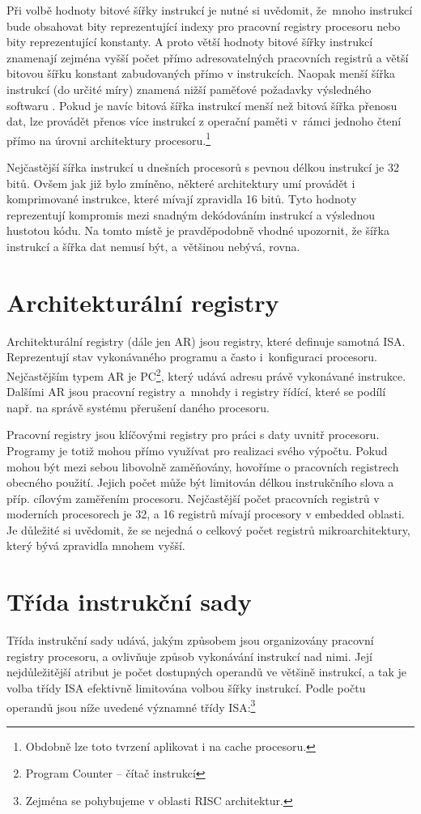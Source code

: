 \documentclass[
  digital, %
  color,   %
  table,   %
  twoside, %
  nolof,   %
  nolot,   %
]{fithesis3}
\begin{document}
Při volbě hodnoty bitové šířky instrukcí je nutné si uvědomit, že~mnoho instrukcí bude obsahovat bity reprezentující indexy pro pracovní registry procesoru nebo bity reprezentující konstanty. A proto větší hodnoty bitové šířky instrukcí znamenají zejména vyšší počet přímo adresovatelných pracovních registrů a větší bitovou šířku konstant zabudovaných přímo v instrukcích. Naopak menší šířka instrukcí (do určité míry) znamená nižší paměťové požadavky výsledného softwaru \parencite{bunda93}. Pokud je navíc bitová šířka instrukcí menší než bitová šířka přenosu dat, lze provádět přenos více instrukcí z operační paměti v~rámci jednoho čtení přímo na úrovni architektury procesoru.\footnote{Obdobně lze toto tvrzení aplikovat i na cache procesoru.}

Nejčastější šířka instrukcí u dnešních procesorů s pevnou délkou instrukcí je 32 bitů. Ovšem jak již bylo zmíněno, některé architektury umí provádět i komprimované instrukce, které mívají zpravidla 16 bitů. Tyto hodnoty reprezentují kompromis mezi snadným dekódováním instrukcí a výslednou hustotou kódu. Na tomto místě je pravděpodobně vhodné upozornit, že šířka instrukcí a šířka dat nemusí být, a~většinou nebývá, rovna.

\section{Architekturální registry}
Architekturální registry (dále jen AR) jsou registry, které definuje samotná ISA. Reprezentují stav vykonávaného programu a často i~konfiguraci procesoru. Nejčastějším typem AR je PC\footnote{Program Counter -- čítač instrukcí}, který udává adresu právě vykonávané instrukce. Dalšími AR jsou pracovní registry a~mnohdy i registry řídící, které se podílí např. na správě systému přerušení daného procesoru.

Pracovní registry jsou klíčovými registry pro práci s daty uvnitř procesoru. Programy je totiž mohou přímo využívat pro realizaci svého výpočtu. Pokud mohou být mezi sebou libovolně zaměňovány, hovoříme o pracovních registrech obecného použití. Jejich počet může být limitován délkou instrukčního slova a příp. cílovým zaměřením procesoru. Nejčastější počet pracovních registrů v moderních procesorech je 32, a 16 registrů mívají procesory v embedded oblasti. Je důležité si uvědomit, že se nejedná o celkový počet registrů mikroarchitektury, který bývá zpravidla mnohem vyšší.

\section{Třída instrukční sady}
Třída instrukční sady udává, jakým způsobem jsou organizovány pracovní registry procesoru, a ovlivňuje způsob vykonávání instrukcí nad nimi. Její nejdůležitější atribut je počet dostupných operandů ve většině instrukcí, a tak je volba třídy ISA efektivně limitována volbou šířky instrukcí. Podle počtu operandů jsou níže uvedené významné třídy ISA:\footnote{Zejména se pohybujeme v oblasti RISC architektur.}
\end{document}

